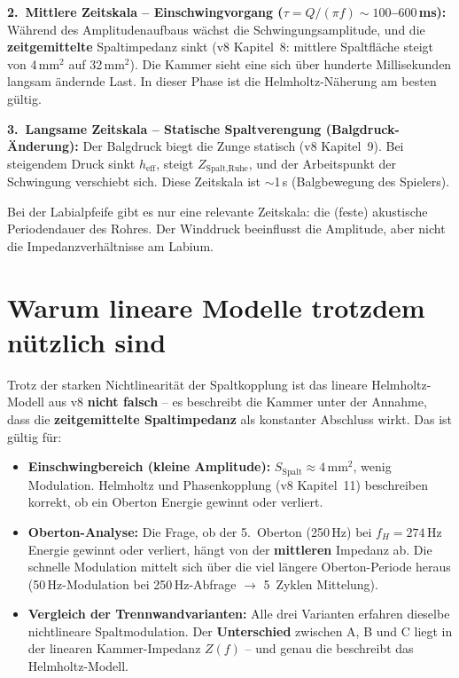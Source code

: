\documentclass[11pt,a4paper]{article}
\begin{document}
\textbf{2.\ Mittlere Zeitskala -- Einschwingvorgang ($\tau = Q/(\pi f) \sim 100$--$600$\,ms):} Während des Amplitudenaufbaus wächst die Schwingungsamplitude, und die \textbf{zeitgemittelte} Spaltimpedanz sinkt (v8 Kapitel~8: mittlere Spaltfläche steigt von 4\,mm$^2$ auf 32\,mm$^2$). Die Kammer \glqq{}sieht\grqq{} eine sich über hunderte Millisekunden langsam ändernde Last. In dieser Phase ist die Helmholtz-Näherung am besten gültig.

\textbf{3.\ Langsame Zeitskala -- Statische Spaltverengung (Balgdruck-Änderung):} Der Balgdruck biegt die Zunge statisch (v8 Kapitel~9). Bei steigendem Druck sinkt $h_\text{eff}$, steigt $Z_\text{Spalt,Ruhe}$, und der Arbeitspunkt der Schwingung verschiebt sich. Diese Zeitskala ist $\sim$1\,s (Balgbewegung des Spielers).

Bei der Labialpfeife gibt es nur eine relevante Zeitskala: die (feste) akustische Periodendauer des Rohres. Der Winddruck beeinflusst die Amplitude, aber nicht die Impedanzverhältnisse am Labium.

\section{Warum lineare Modelle trotzdem nützlich sind}

Trotz der starken Nichtlinearität der Spaltkopplung ist das lineare Helmholtz-Modell aus v8 \textbf{nicht falsch} -- es beschreibt die Kammer unter der Annahme, dass die \textbf{zeitgemittelte Spaltimpedanz} als konstanter Abschluss wirkt. Das ist gültig für:

\begin{itemize}[leftmargin=5mm, itemsep=3pt]
\item \textbf{Einschwingbereich (kleine Amplitude):} $S_\text{Spalt} \approx 4$\,mm$^2$, wenig Modulation. Helmholtz und Phasenkopplung (v8 Kapitel~11) beschreiben korrekt, ob ein Oberton Energie gewinnt oder verliert.

\item \textbf{Oberton-Analyse:} Die Frage, ob der 5.\ Oberton (250\,Hz) bei $f_H = 274$\,Hz Energie gewinnt oder verliert, hängt von der \textbf{mittleren} Impedanz ab. Die schnelle Modulation mittelt sich über die viel längere Oberton-Periode heraus (50\,Hz-Modulation bei 250\,Hz-Abfrage $\to$ 5~Zyklen Mittelung).

\item \textbf{Vergleich der Trennwandvarianten:} Alle drei Varianten erfahren dieselbe nichtlineare Spaltmodulation. Der \textbf{Unterschied} zwischen A, B und C liegt in der linearen Kammer-Impedanz $Z(f)$ -- und genau die beschreibt das Helmholtz-Modell.
\end{itemize}
\end{document}
